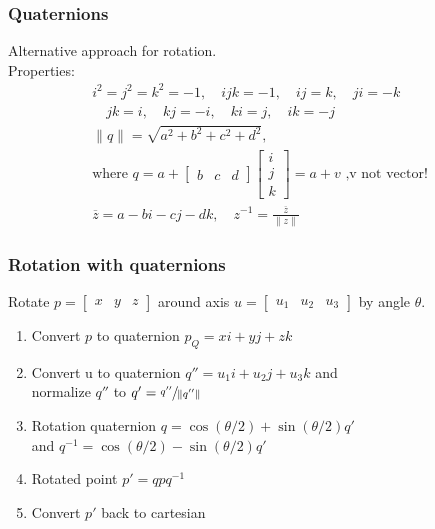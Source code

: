 \documentclass[a4paper,10pt]{article}
\begin{document}
\subsubsection{Quaternions} Alternative approach for rotation. \\
Properties:
\begin{align*}
	i^2=j^2=k^2 = -1, \quad ijk = -1, \quad ij=k, \quad ji=-k \\ \quad jk=i, \quad kj = -i, \quad ki = j, \quad ik = -j \\
	\lVert q \rVert = \sqrt{a^2+b^2+c^2+d^2},\\ \text{where } q = a + \left[\begin{smallmatrix} b & c & d \end{smallmatrix}\right] \left[\begin{smallmatrix} i \\ j \\ k \end{smallmatrix}\right] = a + v \text{ ,v not vector!} \\
	\overline{z} = a - bi - cj - dk, \quad z^{-1} = \frac{\overline{z}}{\lVert z \rVert}
\end{align*}

\subsubsection{Rotation with quaternions} Rotate \( p = \left[\begin{smallmatrix} x & y & z \end{smallmatrix}\right] \) around axis \( u = \left[\begin{smallmatrix} u_{1} & u_{2} & u_{3} \end{smallmatrix}\right] \) by angle \( \theta  \).
\begin{enumerate}
    \item Convert \( p \) to quaternion \( p_Q = xi + yj + zk \)
    \item Convert u to quaternion \( q'' = u_{1}i+u_{2}j+u_{3}k \) and \\ normalize \( q'' \) to \( q' = \sfrac{q''}{\lVert q'' \rVert} \)
    \item Rotation quaternion \( q = \cos (\theta /2) + \sin (\theta /2) q' \) \\ and \( q^{-1} = \cos (\theta /2) - \sin (\theta /2) q' \)
    \item Rotated point \( p' = q p q^{-1} \)
    \item Convert \( p' \) back to cartesian
\end{enumerate}
\end{document}
